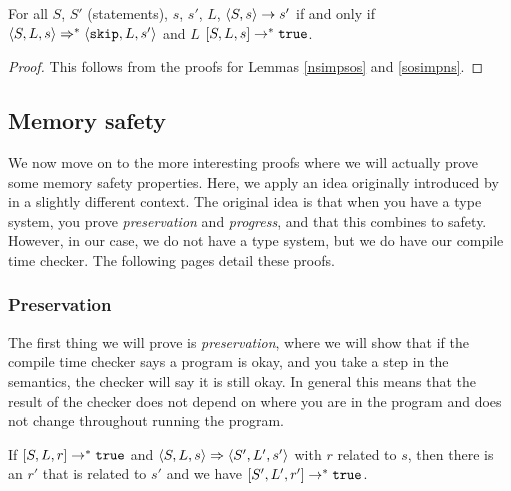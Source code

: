 \begin{theorem}
For all $S$, $S'$ (statements), $s$, $s'$, $L$, $\langle S, s \rangle \to s'$ if and only if $\langle S, L, s \rangle \Rightarrow ^{*} \langle \texttt{skip}, L, s' \rangle$ and $L$ $[ S, L, s ] \to^{*} \texttt{true}$.
\end{theorem}

\begin{proof}
This follows from the proofs for Lemmas \ref{nsimpsos} and \ref{sosimpns}.
\end{proof}

\subsection{Memory safety}
We now move on to the more interesting proofs where we will actually prove some memory safety properties. Here, we apply an idea originally introduced by \cite{wright1994syntactic} in a slightly different context. The original idea is that when you have a type system, you prove \emph{preservation} and \emph{progress}, and that this combines to safety. However, in our case, we do not have a type system, but we do have our compile time checker. The following pages detail these proofs.

\subsubsection*{Preservation}
The first thing we will prove is \emph{preservation}, where we will show that if the compile time checker says a program is okay, and you take a step in the semantics, the checker will say it is still okay. In general this means that the result of the checker does not depend on where you are in the program and does not change throughout running the program. 

\begin{theorem}
\label{preservation}
If $[ S, L, r ] \to ^* \texttt{true}$ and $\langle S, L, s \rangle \Rightarrow \langle S', L', s' \rangle$ with $r$ related to $s$, then there is an $r'$ that is related to $s'$ and we have $[ S', L', r' ] \to ^* \texttt{true}$.
\end{theorem}

